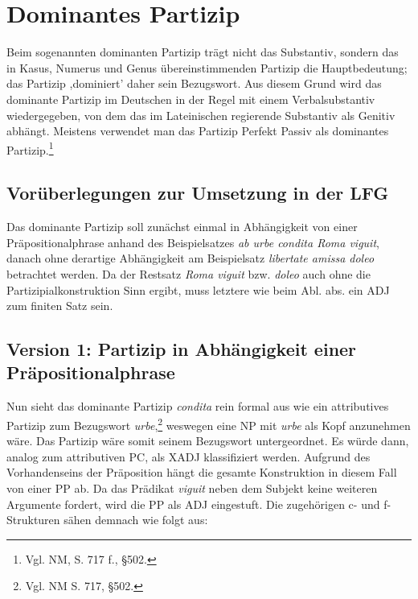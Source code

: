 \documentclass[12pt,a4paper]{article}
\begin{document}
\section{Dominantes Partizip}
Beim sogenannten dominanten Partizip trägt nicht das Substantiv, sondern das in Kasus, Numerus und Genus übereinstimmenden Partizip die Hauptbedeutung; das Partizip ,dominiert' daher sein Bezugswort.
Aus diesem Grund wird das dominante Partizip im Deutschen in der Regel mit einem Verbalsubstantiv wiedergegeben, von dem das im Lateinischen regierende Substantiv als Genitiv abhängt. Meistens verwendet man das Partizip Perfekt Passiv als dominantes Partizip.\footnote{Vgl. NM, S. 717 f., §502.}\\

\subsection{Vorüberlegungen zur Umsetzung in der LFG}
Das dominante Partizip soll zunächst einmal in Abhängigkeit von einer Präpositionalphrase anhand des Beispielsatzes \textit{ab urbe condita Roma viguit}, danach ohne derartige Abhängigkeit am Beispielsatz \textit{libertate amissa doleo} betrachtet werden. Da der Restsatz \textit{Roma viguit} bzw. \textit{doleo} auch ohne die Partizipialkonstruktion Sinn ergibt, muss letztere wie beim Abl. abs. ein ADJ zum finiten Satz sein.

\subsection{Version 1: Partizip in Abhängigkeit einer Präpositionalphrase}
Nun sieht das dominante Partizip \textit{condita} rein formal aus wie ein attributives Partizip zum Bezugswort \textit{urbe},\footnote{Vgl. NM S. 717, §502.} weswegen eine NP mit \textit{urbe} als Kopf anzunehmen wäre. Das Partizip wäre somit seinem Bezugswort untergeordnet. Es würde dann, analog zum attributiven PC, als XADJ klassifiziert werden. Aufgrund des Vorhandenseins der Präposition hängt die gesamte Konstruktion in diesem Fall von einer PP ab. Da das Prädikat \textit{viguit} neben dem Subjekt keine weiteren Argumente fordert, wird die PP als ADJ eingestuft. Die zugehörigen c- und f-Strukturen sähen demnach wie folgt aus:
\end{document}
